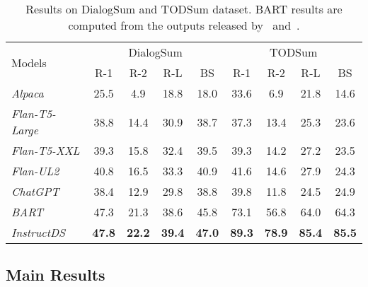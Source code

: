 \documentclass[11pt]{article}
\begin{document}
\begin{table*}[t]
        \centering
        \begin{adjustbox}{width=0.82\textwidth,center}
        \begin{tabular}{ | l | c  c  c  c | c  c  c  c | }
        \toprule
        \multirow{2}{*}{Models} & \multicolumn{4}{c|}{DialogSum} & \multicolumn{4}{c|}{TODSum}\\ \cline{2-9}
         & R-1 & R-2 & R-L & BS & R-1 & R-2 & R-L & BS \\
        \hline
        \emph{Alpaca} & 25.5 & 4.9 & 18.8 & 18.0 & 33.6 & 6.9 & 21.8 & 14.6 \\
        \emph{Flan-T5-Large} & 38.8 & 14.4 & 30.9 & 38.7 & 37.3 & 13.4 & 25.3 & 23.6 \\
        \emph{Flan-T5-XXL} & 39.3 & 15.8 & 32.4 & 39.5 & 39.3 & 14.2 & 27.2 & 23.5 \\
        \emph{Flan-UL2} & 40.8 & 16.5 & 33.3 & 40.9 & 41.6 & 14.6 & 27.9 & 24.3 \\
        \emph{ChatGPT} & 38.4 & 12.9 & 29.8 & 38.8 & 39.8 & 11.8 & 24.5 & 24.9 \\
        \emph{BART} & 47.3 & 21.3 & 38.6 & 45.8 & 73.1 & 56.8 & 64.0 & 64.3 \\
        \hline
        \emph{InstructDS} & \textbf{47.8} & \textbf{22.2} & \textbf{39.4} & \textbf{47.0} & \textbf{89.3} & \textbf{78.9} & \textbf{85.4} & \textbf{85.5} \\ 
        \bottomrule
        \end{tabular}
        \end{adjustbox}
        \caption{Results on DialogSum and TODSum dataset. BART results are computed from the outputs released by~\citet{chen-etal-2021-dialogsum} and~\citet{zhao2021todsum}.}
        \label{tab:dialogsum_tod}
    \end{table*}



    \subsection{Main Results}
    \label{sec:exp_main_results}
\end{document}
